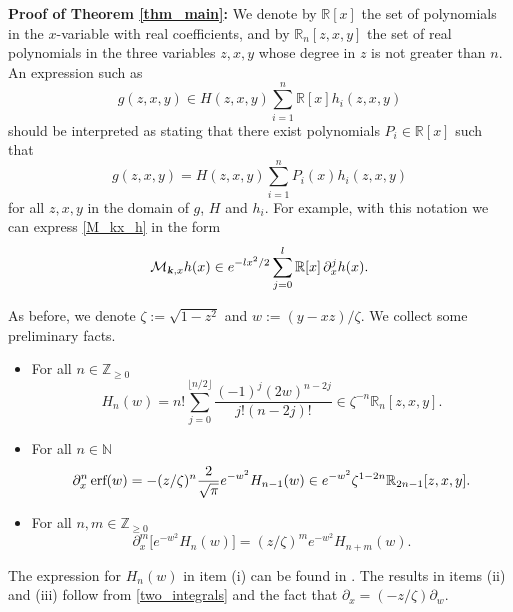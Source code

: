 \documentclass[12pt]{article}
\def\r{{\mathbb R}}
\def\z{{\mathbb Z}}
\def\k{\textbf{\textsl{k}}}
\begin{document}
\noindent
{\bf Proof of Theorem \ref{thm_main}:}
We denote by $\r[x]$ the set of polynomials in the $x$-variable with real coefficients, and by $\r_{n}[z,x,y]$ the set of real polynomials in the three variables $z,x,y$ whose degree in $z$ is not greater than $n$. 
An expression such as 
\[
g(z,x,y) \in H(z,x,y) \sum\limits_{i=1}^n \r[x] h_{i}(z,x,y)
\]
should be interpreted as stating that there exist polynomials $P_i \in \r[x]$ such that 
\[
g(z,x,y) = H(z,x,y) \sum\limits_{i=1}^n P_i(x) h_{i}(z,x,y)
\]
for all $z,x,y$ in the domain of $g$, $H$ and $h_i$. For example, with this notation we can express \eqref{M_kx_h} in the form 
\begin{equation}\label{item_i}
{\mathcal M}_{\k,x} h(x) \in e^{-l x^2/2}\sum\limits_{j=0}^l \r[x] \, \partial_x^j h(x). 
\end{equation}


As before, we denote $\zeta:=\sqrt{1-z^2}$ and $w:=(y-xz)/\zeta$. We collect some preliminary facts. 
\begin{itemize}
\item[(i)] For all $n\in \z_{\geqslant 0}$ 
\begin{equation}\label{item_ii}
 H_n(w)=n! \sum\limits_{j=0}^{\lfloor n/2 \rfloor} \frac{(-1)^j (2w)^{n-2j}}{j! (n-2j)!}   \in \zeta^{-n} \r_{n}[z,x,y]. 
\end{equation}
\item[(ii)] For all $n\in {\mathbb N}$ 
\begin{equation}\label{item_iii}
\partial_x^n \, {\textnormal{erf}}(w)=-(z/\zeta)^n \frac{2}{\sqrt{\pi}}  e^{-w^2} H_{n-1}(w) \in e^{-w^2} \zeta^{1-2n} \r_{2n-1}[z,x,y].
\end{equation}
\item[(iii)] For all $n,m \in \z_{\geqslant 0}$ 
\begin{equation}\label{item_iv}
\partial_x^m \Big[ e^{-w^2} H_n(w)\Big]=(z/\zeta)^m e^{-w^2} H_{n+m}(w).
\end{equation}
\end{itemize}
The expression for $H_n(w)$ in item (i) can be found  in \cite[formula 18.5.13]{NIST}. The results in items (ii) and (iii) follow from \eqref{two_integrals} and the fact that $\partial_x = (-z/\zeta) \partial_w$. 
\end{document}
